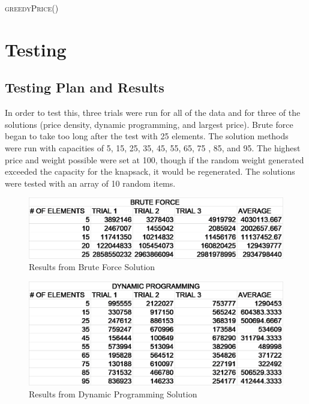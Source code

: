 \documentclass[onecolumn, letterpaper, 12pt]{article}
\begin{document}
\begin{algorithm}[H]
\caption {\textsc{greedyPrice}()}
\label{greedyPriceps}
\begin{algorithmic}[1]

\EndIf
{}
\EndFor


\EndProcedure
\end{algorithmic}
\end{algorithm}

\section{Testing}
\subsection{Testing Plan and Results}
In order to test this, three trials were run for all of the data and for three of the solutions (price density, dynamic programming, and largest price). Brute force began to take too long after the test with 25 elements. The solution methods were run with capacities of 5, 15, 25, 35, 45, 55, 65, 75 , 85, and 95. The highest price and weight possible were set at 100, though if the random weight generated exceeded the capacity for the knapsack, it would be regenerated. The solutions were tested with an array of 10 random items.

\begin{figure}[H]
\centering
\includegraphics[width=0.8\linewidth]{./bruteForceTable.png}
\caption{Results from Brute Force Solution}
\label{fig:bruteForceResults}
\end{figure}

\begin{figure}[H]
\centering
\includegraphics[width=0.8\linewidth]{./dynamicProgrammingTable.png}
\caption{Results from Dynamic Programming Solution}
\label{fig:dpResults}
\end{figure}
\end{document}
